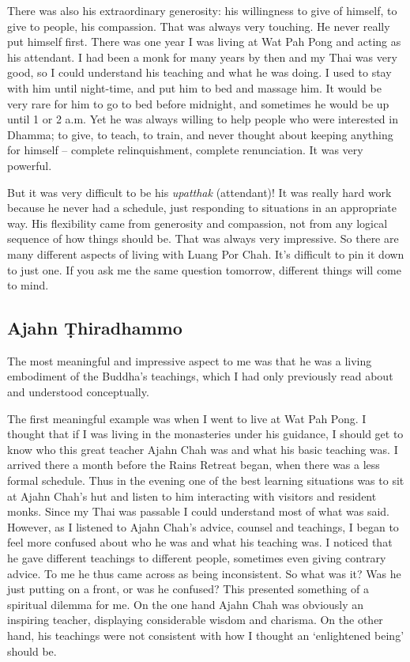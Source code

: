 There was also his extraordinary generosity: his willingness to give of
himself, to give to people, his compassion. That was always very
touching. He never really put himself first. There was one year I was
living at Wat Pah Pong and acting as his attendant. I had been a monk
for many years by then and my Thai was very good, so I could understand
his teaching and what he was doing. I used to stay with him until
night-time, and put him to bed and massage him. It would be very rare
for him to go to bed before midnight, and sometimes he would be up until
1 or 2 a.m. Yet he was always willing to help people who were interested
in Dhamma; to give, to teach, to train, and never thought about keeping
anything for himself -- complete relinquishment, complete renunciation. 
It was very powerful. 

But it was very difficult to be his \emph{upatthak} (attendant)! It was
really hard work because he never had a schedule, just responding to
situations in an appropriate way. His flexibility came from generosity
and compassion, not from any logical sequence of how things should be. 
That was always very impressive. So there are many different aspects of
living with Luang Por Chah. It's difficult to pin it down to just one. 
If you ask me the same question tomorrow, different things will come to
mind. 

\subsection{Ajahn Ṭhiradhammo}

The most meaningful and impressive aspect to me was that he was a living
embodiment of the Buddha's teachings, which I had only previously read
about and understood conceptually. 

The first meaningful example was when I went to live at Wat Pah Pong. I
thought that if I was living in the monasteries under his guidance, I
should get to know who this great teacher Ajahn Chah was and what his
basic teaching was. I arrived there a month before the Rains Retreat
began, when there was a less formal schedule. Thus in the evening one of
the best learning situations was to sit at Ajahn Chah's hut and listen
to him interacting with visitors and resident monks. Since my Thai was
passable I could understand most of what was said. However, as I
listened to Ajahn Chah's advice, counsel and teachings, I began to feel
more confused about who he was and what his teaching was. I noticed that
he gave different teachings to different people, sometimes even giving
contrary advice. To me he thus came across as being inconsistent. So
what was it? Was he just putting on a front, or was he confused? This
presented something of a spiritual dilemma for me. On the one hand Ajahn
Chah was obviously an inspiring teacher, displaying considerable wisdom
and charisma. On the other hand, his teachings were not consistent with
how I thought an `enlightened being' should be. 

